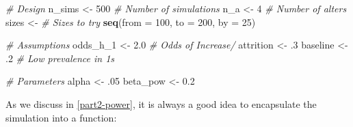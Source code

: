 \documentclass[
]{book}
\newenvironment{Shaded}{\begin{snugshade}}{\end{snugshade}}
\newcommand{\AttributeTok}[1]{\textcolor[rgb]{0.13,0.29,0.53}{#1}}
\newcommand{\CommentTok}[1]{\textcolor[rgb]{0.56,0.35,0.01}{\textit{#1}}}
\newcommand{\DecValTok}[1]{\textcolor[rgb]{0.00,0.00,0.81}{#1}}
\newcommand{\FloatTok}[1]{\textcolor[rgb]{0.00,0.00,0.81}{#1}}
\newcommand{\FunctionTok}[1]{\textcolor[rgb]{0.13,0.29,0.53}{\textbf{#1}}}
\newcommand{\NormalTok}[1]{#1}
\newcommand{\OtherTok}[1]{\textcolor[rgb]{0.56,0.35,0.01}{#1}}
\begin{document}
\begin{Shaded}
\begin{Highlighting}[]
\CommentTok{\# Design}
\NormalTok{n\_sims    }\OtherTok{\textless{}{-}} \DecValTok{500} \CommentTok{\# Number of simulations}
\NormalTok{n\_a       }\OtherTok{\textless{}{-}} \DecValTok{4}   \CommentTok{\# Number of alters}
\NormalTok{sizes     }\OtherTok{\textless{}{-}}     \CommentTok{\# Sizes to try}
  \FunctionTok{seq}\NormalTok{(}\AttributeTok{from =} \DecValTok{100}\NormalTok{, }\AttributeTok{to =} \DecValTok{200}\NormalTok{, }\AttributeTok{by =} \DecValTok{25}\NormalTok{)}

\CommentTok{\# Assumptions}
\NormalTok{odds\_h\_1  }\OtherTok{\textless{}{-}} \FloatTok{2.0} \CommentTok{\# Odds of Increase/}
\NormalTok{attrition }\OtherTok{\textless{}{-}}\NormalTok{ .}\DecValTok{3}
\NormalTok{baseline  }\OtherTok{\textless{}{-}}\NormalTok{ .}\DecValTok{2}  \CommentTok{\# Low prevalence in 1s}

\CommentTok{\# Parameters}
\NormalTok{alpha    }\OtherTok{\textless{}{-}}\NormalTok{ .}\DecValTok{05}
\NormalTok{beta\_pow }\OtherTok{\textless{}{-}} \FloatTok{0.2}
\end{Highlighting}
\end{Shaded}

As we discuss in \ref{part2-power}, it is always a good idea to encapsulate the simulation into a function:
\end{document}
